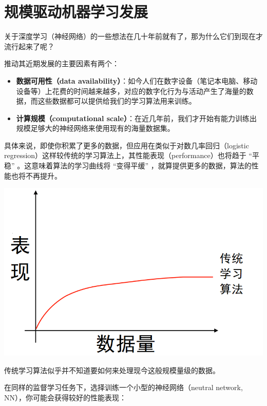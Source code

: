 \hypertarget{ux89c4ux6a21ux9a71ux52a8ux673aux5668ux5b66ux4e60ux53d1ux5c55}{%
\chapter{规模驱动机器学习发展}\label{ux89c4ux6a21ux9a71ux52a8ux673aux5668ux5b66ux4e60ux53d1ux5c55}}

关于深度学习（神经网络）的一些想法在几十年前就有了，那为什么它们到现在才流行起来了呢？

推动其近期发展的主要因素有两个：

\begin{itemize}
\tightlist
\item
  \textbf{数据可用性（data
  availability）}：如今人们在数字设备（笔记本电脑、移动设备等）上花费的时间越来越多，对应的数字化行为与活动产生了海量的数据，而这些数据都可以提供给我们的学习算法用来训练。
\item
  \textbf{计算规模（computational
  scale）}：在近几年前，我们才开始有能力训练出规模足够大的神经网络来使用现有的海量数据集。
\end{itemize}

具体来说，即使你积累了更多的数据，但应用在类似于对数几率回归（logistic
regression）这样较传统的学习算法上，其性能表现（performance）也将趋于
``平稳'' 。这意味着算法的学习曲线将 ``变得平缓''
，就算提供更多的数据，算法的性能也将不再提升。

\includegraphics{./img/ch04_01.png}

传统学习算法似乎并不知道要如何来处理现今这般规模量级的数据。

在同样的监督学习任务下，选择训练一个小型的神经网络（neutral network,
NN），你可能会获得较好的性能表现：

